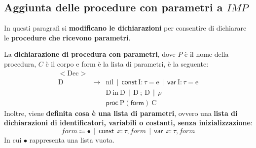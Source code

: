 \documentclass[a4paper]{article}
\begin{document}
	\subsection{Aggiunta delle procedure con parametri a $IMP$}
	
	In questi paragrafi si \textbf{modificano le dichiarazioni} per consentire di dichiarare le \textbf{procedure che ricevono parametri}.\newline
	
	\noindent
	La \textbf{dichiarazione di procedura con parametri}, dove $P$ è il nome della procedura, $C$ è il corpo e \textsf{form} è la lista di parametri, è la seguente:
	\begin{equation*}
		\begin{array}{rll}
			\mathrm{<Dec>} & & \\
			\mathrm{D} & \rightarrow & \mathrm{nil} \:\: | \:\: \textsf{const} \: \mathrm{I}:\tau = \mathrm{e} \:\: | \:\: \textsf{var} \: \mathrm{I} : \tau = \mathrm{e} \\
			&& \mathrm{D} \: \mathrm{in} \: \mathrm{D} \:\: | \:\: \mathrm{D} \: ; \: \mathrm{D} \:\: | \:\: \rho \\
			&& \textsf{proc} \: \mathrm{P(\textsf{form})} \: \mathrm{C}
		\end{array}
	\end{equation*}
	Inoltre, viene \textbf{definita cosa è una lista di parametri}, ovvero una \textbf{lista di dichiarazioni di identificatori, variabili o costanti, senza inizializzazione}:
	\begin{equation*}
		form \Coloneq \bullet \:\: | \:\: \textsf{const} \:\: x : \tau, form \:\: | \:\: \textsf{var} \:\: x : \tau,form
	\end{equation*}
	In cui $\bullet$ rappresenta una lista vuota.\newline
	
\end{document}
